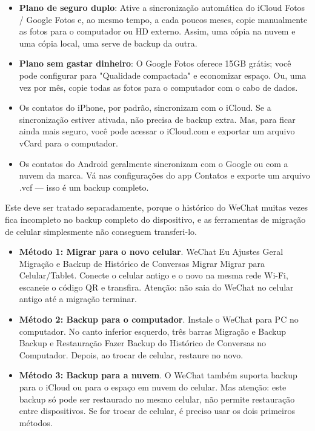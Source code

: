 \begin{itemize}
  \item \textbf{Plano de seguro duplo}: Ative a sincronização automática do iCloud Fotos / Google Fotos e, ao mesmo tempo, a cada poucos meses, copie manualmente as fotos para o computador ou HD externo. Assim, uma cópia na nuvem e uma cópia local, uma serve de backup da outra.
  \item \textbf{Plano sem gastar dinheiro}: O Google Fotos oferece 15GB grátis; você pode configurar para "Qualidade compactada" e economizar espaço. Ou, uma vez por mês, copie todas as fotos para o computador com o cabo de dados.
\end{itemize}


\begin{itemize}
  \item Os contatos do iPhone, por padrão, sincronizam com o iCloud. Se a sincronização estiver ativada, não precisa de backup extra. Mas, para ficar ainda mais seguro, você pode acessar o iCloud.com e exportar um arquivo vCard para o computador.
  \item Os contatos do Android geralmente sincronizam com o Google ou com a nuvem da marca. Vá nas configurações do app Contatos e exporte um arquivo .vcf — isso é um backup completo.
\end{itemize}


Este deve ser tratado separadamente, porque o histórico do WeChat muitas vezes fica incompleto no backup completo do dispositivo, e as ferramentas de migração de celular simplesmente não conseguem transferi-lo.

\begin{itemize}
  \item \textbf{Método 1: Migrar para o novo celular}. WeChat Eu Ajustes Geral Migração e Backup de Histórico de Conversas Migrar Migrar para Celular/Tablet. Conecte o celular antigo e o novo na mesma rede Wi-Fi, escaneie o código QR e transfira. Atenção: não saia do WeChat no celular antigo até a migração terminar.
  \item \textbf{Método 2: Backup para o computador}. Instale o WeChat para PC no computador. No canto inferior esquerdo, três barras Migração e Backup Backup e Restauração Fazer Backup do Histórico de Conversas no Computador. Depois, ao trocar de celular, restaure no novo.
  \item \textbf{Método 3: Backup para a nuvem}. O WeChat também suporta backup para o iCloud ou para o espaço em nuvem do celular. Mas atenção: este backup só pode ser restaurado no mesmo celular, não permite restauração entre dispositivos. Se for trocar de celular, é preciso usar os dois primeiros métodos.
\end{itemize}


